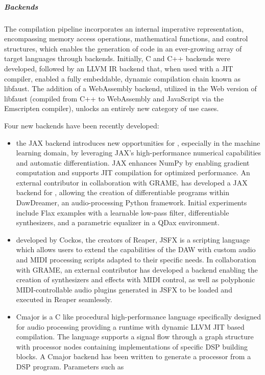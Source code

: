 \subparagraph{Backends}

The \F{} compilation pipeline incorporates an internal imperative
representation, encompassing memory access operations, mathematical
functions, and control structures, which enables the generation of code
in an ever-growing array of target languages through backends.
Initially, C and C++ backends were developed, followed by an LLVM IR
backend that, when used with a JIT compiler, enabled a fully embeddable,
dynamic compilation chain known as libfaust. The addition of a
WebAssembly backend, utilized in the Web version of libfaust (compiled
from C++ to WebAssembly and JavaScript via the Emscripten compiler),
unlocks an entirely new category of use cases.

Four new backends have been recently developed:

\begin{itemize}
\item
  the JAX backend introduces new opportunities for \F{}, especially in
  the machine learning domain, by leveraging JAX's high-performance
  numerical capabilities and automatic differentiation. JAX enhances
  NumPy by enabling gradient computation and supports JIT compilation
  for optimized performance. An external contributor in collaboration
  with GRAME, has developed a JAX backend for \F{}, allowing the
  creation of differentiable \F{} programs within DawDreamer, an
  audio-processing Python framework. Initial experiments include Flax
  examples with a learnable low-pass filter, differentiable
  synthesizers, and a parametric equalizer in a QDax environment.
\item
  developed by Cockos, the creators of Reaper, JSFX is a scripting
  language which allows users to extend the capabilities of the DAW with
  custom audio and MIDI processing scripts adapted to their specific
  needs. In collaboration with GRAME, an external contributor has
  developed a backend enabling the creation of synthesizers and effects
  with MIDI control, as well as polyphonic MIDI-controllable audio
  plugins generated in JSFX to be loaded and executed in Reaper
  seamlessly.
\item
  Cmajor is a C like procedural high-performance language specifically
  designed for audio processing providing a runtime with dynamic LLVM
  JIT based compilation. The language supports a signal flow through a
  graph structure with processor nodes containing implementations of
  specific DSP building blocks. A Cmajor backend has been written to
  generate a processor from a \F{} DSP program. Parameters such as

\end{itemize}

